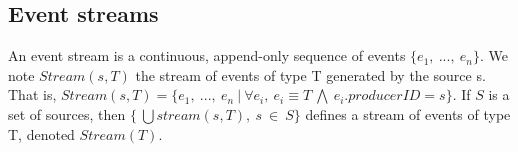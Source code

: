 % 
% 
 \subsection{Event streams}
  An event stream is a continuous, append-only sequence of events $\{e_1,\ ...,\ e_n\}$.
  We note $Stream(s, T)$ the stream of events of type T generated by the source s. That is,
  $Stream(s, T) = \{e_1,\ ...,\ e_n\ |\ \forall e_i,\ e_i \equiv T\ \bigwedge\ e_i.producerID = s\}$.
  If $S$ is a set of sources, then $\{\ \bigcup  stream(s,T),\ s\ \in\ S\}$ defines a stream of events of type T, denoted $Stream(T)$.
